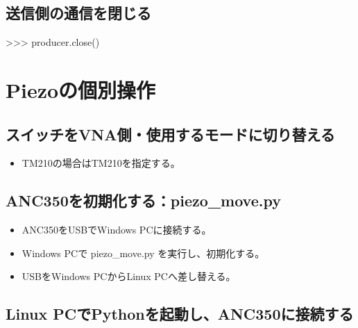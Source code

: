 \documentclass[a4paper,11pt]{ltjsarticle}
\begin{document}
\subsection{送信側の通信を閉じる}

\begin{command}

>>> producer.close()

\end{command}

\section{Piezoの個別操作}

\subsection{スイッチをVNA側・使用するモードに切り替える}

\begin{command}


\end{command}

\begin{itemize}

\item TM210の場合はTM210を指定する。

\end{itemize}

\subsection{ANC350を初期化する：piezo\_move.py}

\begin{itemize}

\item ANC350をUSBでWindows PCに接続する。

\item Windows PCで piezo\_move.py を実行し、初期化する。

\item USBをWindows PCからLinux PCへ差し替える。

\end{itemize}

\subsection{Linux PCでPythonを起動し、ANC350に接続する}
\end{document}
